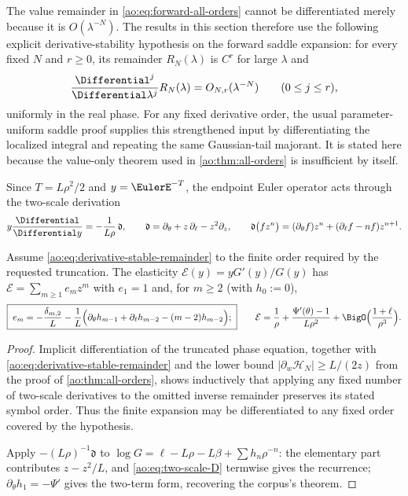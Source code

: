 The value remainder in \eqref{ao:eq:forward-all-orders} cannot be
differentiated merely because it is $O(\lambda^{-N})$.  The results in this
section therefore use the following explicit derivative-stability hypothesis
on the forward saddle expansion: for every fixed $N$ and $r\ge0$, its
remainder $R_N(\lambda)$ is $C^r$ for large $\lambda$ and
\begin{equation}
 \frac{\Differential^j}{\Differential\lambda^j}R_N(\lambda)
 =O_{N,r}(\lambda^{-N})
 \qquad(0\le j\le r),
 \label{ao:eq:derivative-stable-remainder}
\end{equation}
uniformly in the real phase.  For any fixed derivative order, the usual
parameter-uniform saddle proof supplies this strengthened input by
differentiating the localized integral and repeating the same Gaussian-tail
majorant.  It is stated here because the value-only theorem used in
\cref{ao:thm:all-orders} is insufficient by itself.

Since $T=L\rho^{2}/2$ and $y=\EulerE^{-T}$, the endpoint Euler operator
acts through the two-scale derivation
\begin{equation}
 y\frac{\Differential}{\Differential y}=-\frac1{L\rho}\,\mathfrak d,
 \qquad
 \mathfrak d=\partial_\theta+z\,\partial_\ell-z^{2}\partial_z,
 \qquad
 \mathfrak d\bigl(fz^{n}\bigr)
 =(\partial_\theta f)z^{n}
 +(\partial_\ell f-nf)z^{n+1}.
 \label{ao:eq:two-scale-D}
\end{equation}

\begin{theorem}
\label{ao:thm:elasticity}
Assume \eqref{ao:eq:derivative-stable-remainder} to the finite order required
by the requested truncation.
The elasticity
$\mathcal E(y)=yG'(y)/G(y)$ has
$\mathcal E=\sum_{m\ge1}e_mz^{m}$ with $e_1=1$ and, for $m\ge2$
(with $h_0:=0$),
\begin{equation}
 \boxed{\;
 e_m=-\frac{\delta_{m,2}}{L}
 -\frac1L\Bigl(
 \partial_\theta h_{m-1}
 +\partial_\ell h_{m-2}-(m-2)h_{m-2}
 \Bigr);
 \;}
 \qquad
 \mathcal E
 =\frac1\rho+\frac{\Psi'(\theta)-1}{L\rho^{2}}
 +\BigO\Bigl(\frac{1+\ell}{\rho^{3}}\Bigr).
 \label{ao:eq:elasticity}
\end{equation}
\end{theorem}

\begin{proof}
Implicit differentiation of the truncated phase equation, together with
\eqref{ao:eq:derivative-stable-remainder} and the lower bound
$|\partial_w\mathcal H_N|\ge L/(2z)$ from the proof of
\cref{ao:thm:all-orders}, shows inductively that applying any fixed number of
two-scale derivatives to the omitted inverse remainder preserves its stated
symbol order.  Thus the finite expansion may be differentiated to any fixed
order covered by the hypothesis.

Apply $-(L\rho)^{-1}\mathfrak d$ to
$\log G=\ell-L\rho-L\beta+\sum h_n\rho^{-n}$: the elementary part
contributes $z-z^{2}/L$, and \eqref{ao:eq:two-scale-D} termwise gives
the recurrence; $\partial_\theta h_1=-\Psi'$ gives the two-term
form, recovering the corpus's theorem.
\end{proof}

